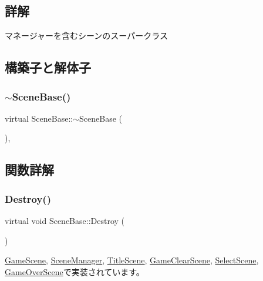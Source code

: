\subsection{詳解}
マネージャーを含むシーンのスーパークラス 

\subsection{構築子と解体子}
\mbox{\label{class_scene_base_a187dd160e5a16909bcc6529851e38318}} 
\subsubsection{\texorpdfstring{$\sim$\+Scene\+Base()}{~SceneBase()}}
{\footnotesize\ttfamily virtual Scene\+Base\+::$\sim$\+Scene\+Base (\begin{DoxyParamCaption}{ }\end{DoxyParamCaption})\hspace{0.3cm}{\ttfamily [inline]}, {\ttfamily [virtual]}}



\subsection{関数詳解}
\mbox{\label{class_scene_base_a7c5b54020bc519b4dadfe9770d6b27f7}} 
\subsubsection{\texorpdfstring{Destroy()}{Destroy()}}
{\footnotesize\ttfamily virtual void Scene\+Base\+::\+Destroy (\begin{DoxyParamCaption}{ }\end{DoxyParamCaption})\hspace{0.3cm}{\ttfamily [pure virtual]}}



\mbox{\hyperlink{class_game_scene_a5c544d5a87a60f09ada75f1f60f0a787}{Game\+Scene}}, \mbox{\hyperlink{class_scene_manager_a0e3ad11342e763f0d4108c0b4674a157}{Scene\+Manager}}, \mbox{\hyperlink{class_title_scene_adfbc5f934572ede2e36419b089c88fe8}{Title\+Scene}}, \mbox{\hyperlink{class_game_clear_scene_a5a3a9e62bb0244b164d9e34663e99594}{Game\+Clear\+Scene}}, \mbox{\hyperlink{class_select_scene_a938293516c0e1ae5bb09dbab81bc78d9}{Select\+Scene}}, \mbox{\hyperlink{class_game_over_scene_a439e4c515c9549abd6eb45f2a3d115fa}{Game\+Over\+Scene}}で実装されています。

